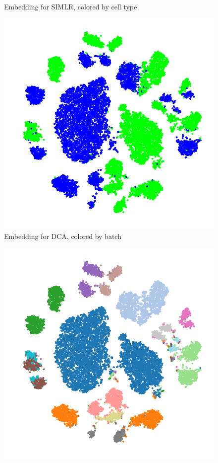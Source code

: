 \begin{suppfigure}[htp]
\begin{subfigure}[b]{0.3\textwidth}
        \caption{Embedding for SIMLR, colored by cell type}
    \end{subfigure}
  \hspace{5pt}
      \begin{subfigure}[b]{0.3\textwidth}
        \includegraphics[width=\textwidth]{figures/DCA_tSNE_bipolar_batch.png}
        \caption{Embedding for DCA, colored by batch}
    \end{subfigure}
  \hspace{5pt}
      \begin{subfigure}[b]{0.3\textwidth}
        \includegraphics[width=\textwidth]{figures/DCA_tSNE_bipolar_clusters.png}

\end{subfigure}
\end{suppfigure}
